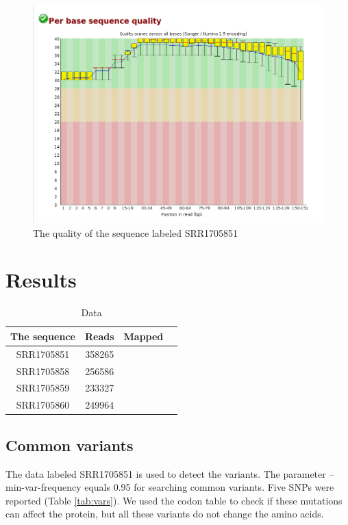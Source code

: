 \documentclass{article}
\begin{document}
\begin{figure}[h]
\centering
\includegraphics[scale=0.35]{data_q.png} 
 
\caption{ The quality of the sequence labeled SRR1705851  }
\label{saw}
\end{figure}

\section{Results}

	\begin{table} 
	\centering
	\begin{tabular}{|c|c|c|c|}
		\hline
		The sequence & Reads & Mapped \\
		\hline
		SRR1705851 & 358265 & \\
		\hline
		SRR1705858 & 256586 & \\
		\hline
		SRR1705859 & 233327 & \\
		\hline
		SRR1705860 & 249964  & \\
		\hline
	\end{tabular}
\caption{Data}
\end{table}
 
\subsection{Common variants}
The  data labeled SRR1705851 is used to detect the variants.  The parameter --min-var-frequency equals 0.95 for searching common variants. Five SNPs were reported (Table \ref{tab:vars}). We used the codon table to check if these mutations can affect the protein, but all these variants do not change the amino acids. 
\end{document}
